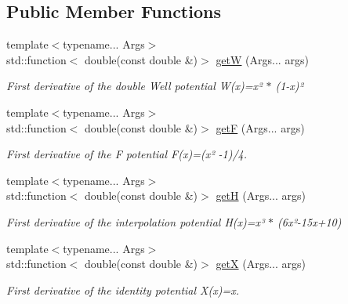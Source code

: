 \subsection*{Public Member Functions}
\begin{DoxyCompactItemize}
\item 
{\footnotesize template$<$typename... Args$>$ }\\std\+::function$<$ double(const double \&)$>$ \hyperlink{structpotential__function_3_011_00_01ThermodynamicsPotentialDiscretization_1_1Implicit_01_4_a54faef5e6e6e4acf56b5e473c765532a}{getW} (Args... args)
\begin{DoxyCompactList}\small\item\em First derivative of the double Well potential W(x)=x² $\ast$ (1-\/x)² \end{DoxyCompactList}\item 
{\footnotesize template$<$typename... Args$>$ }\\std\+::function$<$ double(const double \&)$>$ \hyperlink{structpotential__function_3_011_00_01ThermodynamicsPotentialDiscretization_1_1Implicit_01_4_af57f36f2f98b7c524a03273504fa82a7}{getF} (Args... args)
\begin{DoxyCompactList}\small\item\em First derivative of the F potential F(x)=(x² -\/1)/4. \end{DoxyCompactList}\item 
{\footnotesize template$<$typename... Args$>$ }\\std\+::function$<$ double(const double \&)$>$ \hyperlink{structpotential__function_3_011_00_01ThermodynamicsPotentialDiscretization_1_1Implicit_01_4_a6a52cc510f4213371c7e99e4b6fbe477}{getH} (Args... args)
\begin{DoxyCompactList}\small\item\em First derivative of the interpolation potential H(x)=x³ $\ast$ (6x²-\/15x+10) \end{DoxyCompactList}\item 
{\footnotesize template$<$typename... Args$>$ }\\std\+::function$<$ double(const double \&)$>$ \hyperlink{structpotential__function_3_011_00_01ThermodynamicsPotentialDiscretization_1_1Implicit_01_4_ac886230109344fb32f98f4e5816665c7}{getX} (Args... args)
\begin{DoxyCompactList}\small\item\em First derivative of the identity potential X(x)=x. \end{DoxyCompactList}\end{DoxyCompactItemize}


